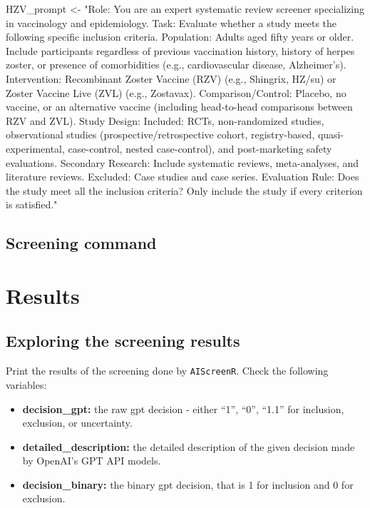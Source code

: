 \documentclass[
  letterpaper,
  DIV=11,
  numbers=noendperiod]{scrartcl}
\newenvironment{Shaded}{\begin{snugshade}}{\end{snugshade}}
\newcommand{\NormalTok}[1]{\textcolor[rgb]{0.00,0.23,0.31}{#1}}
\newcommand{\OtherTok}[1]{\textcolor[rgb]{0.00,0.23,0.31}{#1}}
\newcommand{\StringTok}[1]{\textcolor[rgb]{0.13,0.47,0.30}{#1}}
\begin{document}
\begin{Shaded}
\begin{Highlighting}[]
\NormalTok{HZV\_prompt }\OtherTok{\textless{}{-}} \StringTok{"Role: You are an expert systematic review screener specializing in vaccinology and epidemiology. }
\StringTok{Task: Evaluate whether a study meets the following specific inclusion criteria. }
\StringTok{Population: Adults aged fifty years or older. Include participants regardless of previous vaccination history, history of herpes zoster, or presence of comorbidities (e.g., cardiovascular disease, Alzheimer’s). }
\StringTok{Intervention: Recombinant Zoster Vaccine (RZV) (e.g., Shingrix, HZ/su) or Zoster Vaccine Live (ZVL) (e.g., Zostavax). }
\StringTok{Comparison/Control: Placebo, no vaccine, or an alternative vaccine (including head{-}to{-}head comparisons between RZV and ZVL). }
\StringTok{Study Design: Included: RCTs, non{-}randomized studies, observational studies (prospective/retrospective cohort, registry{-}based, quasi{-}experimental, case{-}control, nested case{-}control), and post{-}marketing safety evaluations. }
\StringTok{Secondary Research: Include systematic reviews, meta{-}analyses, and literature reviews. }
\StringTok{Excluded: Case studies and case series. }
\StringTok{Evaluation Rule: Does the study meet all the inclusion criteria? Only include the study if every criterion is satisfied."}
\end{Highlighting}
\end{Shaded}

\subsection{Screening command}\label{screening-command}

\section{Results}\label{results}

\subsection{Exploring the screening
results}\label{exploring-the-screening-results}

Print the results of the screening done by \texttt{AIScreenR}. Check the
following variables:

\begin{itemize}
\item
  \textbf{decision\_gpt:} the raw gpt decision - either ``1'', ``0'',
  ``1.1'' for inclusion, exclusion, or uncertainty.
\item
  \textbf{detailed\_description:} the detailed description of the given
  decision made by OpenAI's GPT API models.
\item
  \textbf{decision\_binary:} the binary gpt decision, that is 1 for
  inclusion and 0 for exclusion.
\end{itemize}
\end{document}
